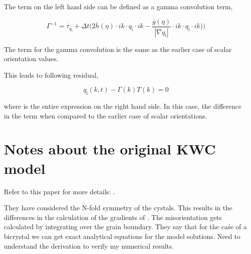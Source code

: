\documentclass[a4paper,11pt,dvipsnames]{article}
\begin{document}
The term on the left hand side can be defined as a gamma convolution term,

\begin{equation}
	\Gamma^{-1} = \overline{\tau}_{q_{\text{i}}} + \Delta t \biggl ( 2 \overline{h} (\eta) \cdot ik \cdot q_{\text{i}} \cdot ik - \frac{\overline{g}(\eta)}{| \nabla q_{\text{i}}| } \cdot ik \cdot q_{\text{i}} \cdot ik \biggr ) \biggr ) \label{eq:42}
\end{equation}

The term for the gamma convolution is the same as the earlier case of scalar orientation values. 

This leads to following residual, 

\begin{equation}
	q_{\text{i}}(k,t) - \Gamma(k) T(k) = 0 \label{eq:43}
\end{equation}

where  is the entire expression on the right hand side. In this case, the difference in the  term when compared to the earlier case of scalar orientations.  

\section{Notes about the original KWC model}
Refer to this paper for more details: \cite{Warren2003}.

They have considered the N-fold symmetry of the cystals. 
This results in the differences in the calculation of the gradients of \mathsym{\theta}. 
The misorientation \mathsym{\Delta \theta} gets calculated by integrating \mathsym{\nabla \theta} over the grain boundary. 
They say that for the caśe of a bicrystal we can get exact analytical equations for the model solutions. 
Need to understand the derivation to verify my numerical results. 



\end{document}
